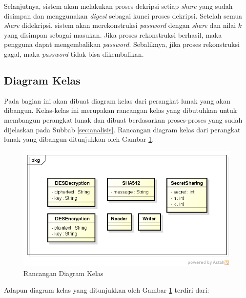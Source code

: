 Selanjutnya, sistem akan melakukan proses dekripsi setiap \textit{share} yang sudah disimpan dan menggunakan \textit{digest} sebagai kunci proses dekripsi. Setelah semua \textit{share} didekripsi, sistem akan merekonstruksi \textit{password} dengan \textit{share} dan nilai $k$ yang disimpan sebagai masukan. Jika proses rekonstruksi berhasil, maka pengguna dapat mengembalikan \textit{password}. Sebaliknya, jika proses rekonstruksi gagal, maka \textit{password} tidak bisa dikembalikan.

\subsection{Diagram Kelas}

Pada bagian ini akan dibuat diagram kelas dari perangkat lunak yang akan dibangun. Kelas-kelas ini merupakan rancangan kelas yang dibutuhkan untuk membangun perangkat lunak dan dibuat berdasarkan proses-proses yang sudah dijelaskan pada Subbab \ref{sec:analisis}. Rancangan diagram kelas dari perangkat lunak yang dibangun ditunjukkan oleh Gambar \ref{fig:diagramkelasdummy}.

\begin{figure}[H]
	\centerline{\includegraphics[scale=0.6]{Gambar/engine-class-diagram}}
	\caption{Rancangan Diagram Kelas}\label{fig:diagramkelasdummy}
\end{figure}

Adapun diagram kelas yang ditunjukkan oleh Gambar \ref{fig:diagramkelasdummy} terdiri dari:

